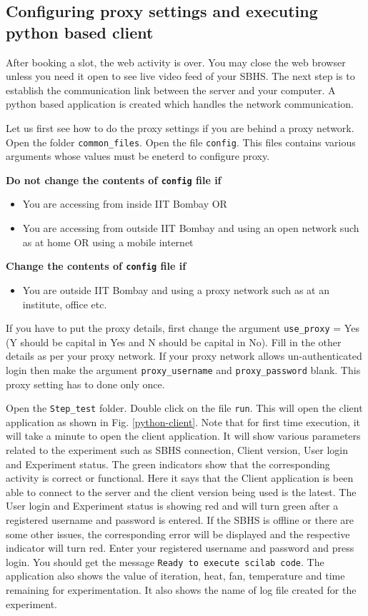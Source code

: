 \subsection{Configuring proxy settings and executing python based client}
After booking a slot, the web activity is over. You may close the web browser unless you need it open to see live video feed of your SBHS. The next step is to establish the communication link between the server and your computer. A python based application is created which handles the network communication. 

Let us first see how to do the proxy  settings if you are behind a proxy network. Open the folder {\tt common\_files}. Open the file {\tt config}. This files contains various arguments whose values must be eneterd to configure proxy. 

{\bf Do not change the contents of {\tt config} file if}
\begin{itemize}
\item You are accessing from inside IIT Bombay OR
\item You are accessing from outside IIT Bombay and using an open network such as at home OR using a mobile internet
\end{itemize}

{\bf Change the contents of {\tt config}  file if}
\begin{itemize}
\item You are outside IIT Bombay and using a proxy network such as at an institute, office etc.
\end{itemize}

If you have to put the proxy details, first change the argument {\tt use\_proxy} = Yes (Y should be capital in Yes and N should be capital in No). Fill in the other details as per your proxy network. If your proxy network allows un-authenticated login then make the argument {\tt proxy\_username} and {\tt proxy\_password}  blank. This proxy setting has to done only once.

Open the {\tt Step\_test} folder. Double click on the file {\tt run}. This will open the client application as shown in Fig. \ref{python-client}. Note that for first time execution, it will take a minute to open the client application. It will show various parameters related to the experiment such as SBHS connection, Client version, User login and Experiment status. The green indicators show that the corresponding activity is correct or functional. Here it says that the Client application is been able to connect to the server and the client version being used is the latest. The User login and Experiment status is showing red and will turn green after a registered username and password is entered. If the SBHS is offline or there are some other issues, the corresponding error will be displayed and the respective indicator will turn red. Enter your registered username and password and press login. You should get the message {\tt Ready to execute scilab code}. The application also shows the value of iteration, heat, fan, temperature and time remaining for experimentation. It also shows the name of log file created for the experiment.

